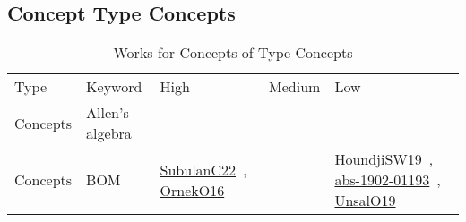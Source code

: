 \clearpage
\subsection{Concept Type Concepts}
\label{sec:Concepts}
{\scriptsize
\begin{longtable}{lp{3cm}>{\raggedright\arraybackslash}p{6cm}>{\raggedright\arraybackslash}p{6cm}>{\raggedright\arraybackslash}p{8cm}}
\rowcolor{white}\caption{Works for Concepts of Type Concepts}\\ \toprule
\rowcolor{white}Type & Keyword & High & Medium & Low\\ \midrule\endhead
\bottomrule
\endfoot
Concepts & Allen's algebra &  &  & \\
Concepts & BOM & \href{../works/SubulanC22.pdf}{SubulanC22}~\cite{SubulanC22}, \href{../works/OrnekO16.pdf}{OrnekO16}~\cite{OrnekO16} &  & \href{../works/HoundjiSW19.pdf}{HoundjiSW19}~\cite{HoundjiSW19}, \href{../works/abs-1902-01193.pdf}{abs-1902-01193}~\cite{abs-1902-01193}, \href{../works/UnsalO19.pdf}{UnsalO19}~\cite{UnsalO19}\\

\end{longtable}}
